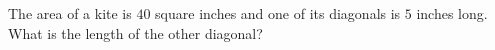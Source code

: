 The area of a kite is $40$ square inches and one of its diagonals is $5$ inches long. What is the length of the other diagonal?
